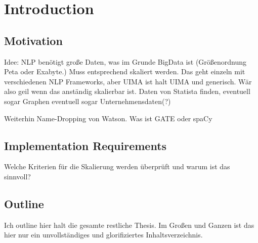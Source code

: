 
\chapter{Introduction}



\section{Motivation}
Idee: NLP benötigt große Daten, was im Grunde BigData ist (Größenordnung Peta oder Exabyte.)
Muss entsprechend skaliert werden. Das geht einzeln mit verschiedenen NLP Frameworks, aber UIMA
ist halt UIMA und generisch. Wär also geil wenn das anständig skalierbar ist.
Daten von Statista finden, eventuell sogar Graphen eventuell sogar Unternehmensdaten(?)

Weiterhin Name-Dropping von Watson. Was ist GATE oder spaCy

\section{Implementation Requirements}
Welche Kriterien für die Skalierung werden überprüft und warum ist das sinnvoll?



\section{Outline}
Ich outline hier halt die gesamte restliche Thesis. Im Großen und Ganzen ist das hier nur ein unvollständiges und glorifiziertes Inhaltsverzeichnis.